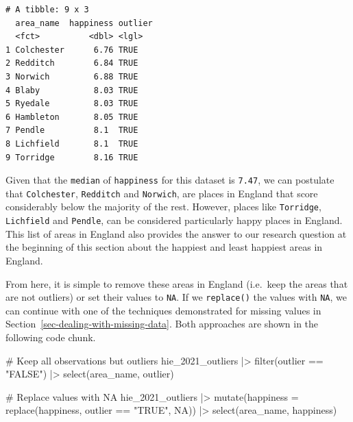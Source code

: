 \documentclass[
  letterpaper,
]{krantz}
\makeatletter
\newenvironment{Shaded}{\begin{snugshade}}{\end{snugshade}}
\newcommand{\AttributeTok}[1]{\textcolor[rgb]{0.40,0.45,0.13}{#1}}
\newcommand{\CommentTok}[1]{\textcolor[rgb]{0.37,0.37,0.37}{#1}}
\newcommand{\ConstantTok}[1]{\textcolor[rgb]{0.56,0.35,0.01}{#1}}
\newcommand{\FunctionTok}[1]{\textcolor[rgb]{0.28,0.35,0.67}{#1}}
\newcommand{\NormalTok}[1]{\textcolor[rgb]{0.00,0.23,0.31}{#1}}
\newcommand{\SpecialCharTok}[1]{\textcolor[rgb]{0.37,0.37,0.37}{#1}}
\newcommand{\StringTok}[1]{\textcolor[rgb]{0.13,0.47,0.30}{#1}}
\newenvironment{kframe}{%
\medskip{}
\setlength{\fboxsep}{.8em}
 \def\at@end@of@kframe{}%
 \ifinner\ifhmode%
  \def\at@end@of@kframe{\end{minipage}}%
  \begin{minipage}{\columnwidth}%
 \fi\fi%
 \def\FrameCommand##1{\hskip\@totalleftmargin \hskip-\fboxsep
 \colorbox{shadecolor}{##1}\hskip-\fboxsep
     \hskip-\linewidth \hskip-\@totalleftmargin \hskip\columnwidth}%
 \MakeFramed {\advance\hsize-\width
   \@totalleftmargin\z@ \linewidth\hsize
   \@setminipage}}%
 {\par\unskip\endMakeFramed%
 \at@end@of@kframe}
\renewenvironment{Shaded}{\begin{kframe}}{\end{kframe}}
\makeatother
\begin{document}
\begin{verbatim}
# A tibble: 9 x 3
  area_name  happiness outlier
  <fct>          <dbl> <lgl>  
1 Colchester      6.76 TRUE   
2 Redditch        6.84 TRUE   
3 Norwich         6.88 TRUE   
4 Blaby           8.03 TRUE   
5 Ryedale         8.03 TRUE   
6 Hambleton       8.05 TRUE   
7 Pendle          8.1  TRUE   
8 Lichfield       8.1  TRUE   
9 Torridge        8.16 TRUE   
\end{verbatim}

Given that the \texttt{median} of \texttt{happiness} for this dataset is
\texttt{7.47}, we can postulate that \texttt{Colchester},
\texttt{Redditch} and \texttt{Norwich}, are places in England that score
considerably below the majority of the rest. However, places like
\texttt{Torridge}, \texttt{Lichfield} and \texttt{Pendle}, can be
considered particularly happy places in England. This list of areas in
England also provides the answer to our research question at the
beginning of this section about the happiest and least happiest areas in
England.

From here, it is simple to remove these areas in England (i.e.~keep the
areas that are not outliers) or set their values to \texttt{NA}. If we
\texttt{replace()} the values with \texttt{NA}, we can continue with one
of the techniques demonstrated for missing values in
Section~\ref{sec-dealing-with-missing-data}. Both approaches are shown
in the following code chunk.

\begin{Shaded}
\begin{Highlighting}[]
\CommentTok{\# Keep all observations but outliers}
\NormalTok{hie\_2021\_outliers }\SpecialCharTok{|\textgreater{}}
  \FunctionTok{filter}\NormalTok{(outlier }\SpecialCharTok{==} \StringTok{"FALSE"}\NormalTok{) }\SpecialCharTok{|\textgreater{}}
  \FunctionTok{select}\NormalTok{(area\_name, outlier)}
\end{Highlighting}
\end{Shaded}

\begin{Shaded}
\begin{Highlighting}[]
\CommentTok{\# Replace values with NA}
\NormalTok{hie\_2021\_outliers }\SpecialCharTok{|\textgreater{}}
  \FunctionTok{mutate}\NormalTok{(}\AttributeTok{happiness =} \FunctionTok{replace}\NormalTok{(happiness, outlier }\SpecialCharTok{==} \StringTok{"TRUE"}\NormalTok{, }\ConstantTok{NA}\NormalTok{)) }\SpecialCharTok{|\textgreater{}}
  \FunctionTok{select}\NormalTok{(area\_name, happiness)}
\end{Highlighting}
\end{Shaded}
\end{document}
